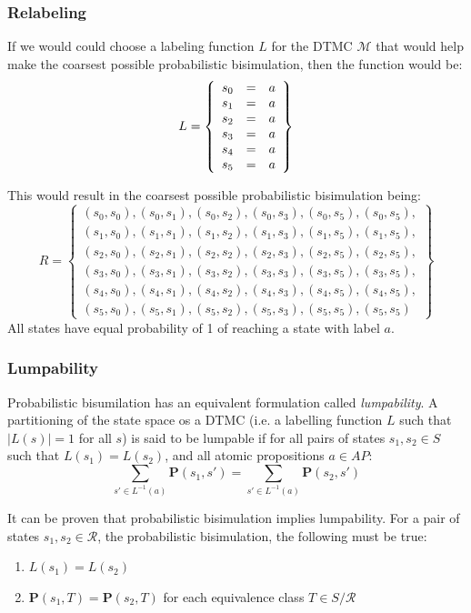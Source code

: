 \documentclass[12pt]{report}
\begin{document}
\subsubsection*{Relabeling}
If we would could choose a labeling function $L$ for the DTMC $\mathcal{M}$ that would help make the coarsest possible probabilistic bisimulation, then the function would be:
$$L = \left\{\begin{array}{l c r}
s_0 & = & a\\
s_1 & = & a\\
s_2 & = & a\\
s_3 & = & a\\
s_4 & = & a\\
s_5 & = & a
\end{array}\right\}$$

This would result in the coarsest possible probabilistic bisimulation being:
$$R = \left\{\begin{array}{c}
(s_0, s_0),(s_0,s_1),(s_0,s_2),(s_0,s_3),(s_0,s_5),(s_0,s_5),\\
(s_1, s_0),(s_1,s_1),(s_1,s_2),(s_1,s_3),(s_1,s_5),(s_1,s_5),\\
(s_2, s_0),(s_2,s_1),(s_2,s_2),(s_2,s_3),(s_2,s_5),(s_2,s_5),\\
(s_3, s_0),(s_3,s_1),(s_3,s_2),(s_3,s_3),(s_3,s_5),(s_3,s_5),\\
(s_4, s_0),(s_4,s_1),(s_4,s_2),(s_4,s_3),(s_4,s_5),(s_4,s_5),\\
(s_5, s_0),(s_5,s_1),(s_5,s_2),(s_5,s_3),(s_5,s_5),(s_5,s_5)
\end{array}\right\}$$
All states have equal probability of 1 of reaching a state with label $a$. 

\subsubsection*{Lumpability}
Probabilistic bisumilation has an equivalent formulation called \emph{lumpability}. A partitioning of the state space os a DTMC (i.e. a labelling function $L$ such that $|L(s)| = 1$ for all $s$) is said to be lumpable if for all pairs of states $s_1,s_2 \in S$ such that $L(s_1) = L(s_2)$, and all atomic propositions $a \in AP$:
$$\sum_{s' \in L^{-1}(a)} \mathbf{P}(s_1,s') = \sum_{s' \in L^{-1}(a)} \mathbf{P}(s_2,s')$$

It can be proven that probabilistic bisimulation implies lumpability. For a pair of states $s_1, s_2 \in \mathcal{R}$, the probabilistic bisimulation, the following must be true:
\begin{enumerate}
	\item $L(s_1) = L(s_2)$
	\item $\mathbf{P}(s_1, T) = \mathbf{P}(s_2, T)$ for each equivalence class $T \in S / \mathcal{R}$
\end{enumerate}
\end{document}
